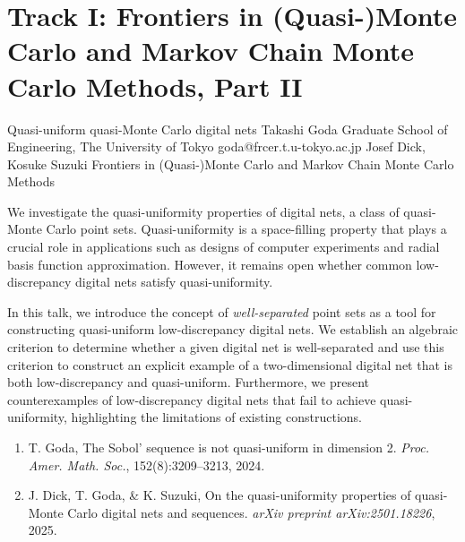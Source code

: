 \section{Track I: Frontiers in (Quasi-)Monte Carlo and Markov Chain Monte Carlo Methods, Part II}\newpage

\begin{talk}
  {Quasi-uniform quasi-Monte Carlo digital nets}%
  {Takashi Goda}%
  {Graduate School of Engineering, The University of Tokyo}%
  {goda@frcer.t.u-tokyo.ac.jp}%
  {Josef Dick, Kosuke Suzuki}%
  {Frontiers in (Quasi-)Monte Carlo and Markov Chain Monte Carlo Methods}%
    
   
We investigate the quasi-uniformity properties of digital nets, a class of quasi-Monte Carlo point sets. Quasi-uniformity is a space-filling property that plays a crucial role in applications such as designs of computer experiments and radial basis function approximation. However, it remains open whether common low-discrepancy digital nets satisfy quasi-uniformity.

In this talk, we introduce the concept of \emph{well-separated} point sets as a tool for constructing quasi-uniform low-discrepancy digital nets. We establish an algebraic criterion to determine whether a given digital net is well-separated and use this criterion to construct an explicit example of a two-dimensional digital net that is both low-discrepancy and quasi-uniform. Furthermore, we present counterexamples of low-discrepancy digital nets that fail to achieve quasi-uniformity, highlighting the limitations of existing constructions.

\begin{enumerate}
 \item[{[1]}] T. Goda, The Sobol’ sequence is not quasi-uniform in dimension 2. \emph{Proc. Amer. Math. Soc.}, 152(8):3209--3213, 2024.
 \item[{[2]}] J. Dick, T. Goda, \& K. Suzuki, On the quasi-uniformity properties of quasi-Monte Carlo digital nets and sequences. \emph{arXiv preprint arXiv:2501.18226}, 2025.
\end{enumerate}
\end{talk}

